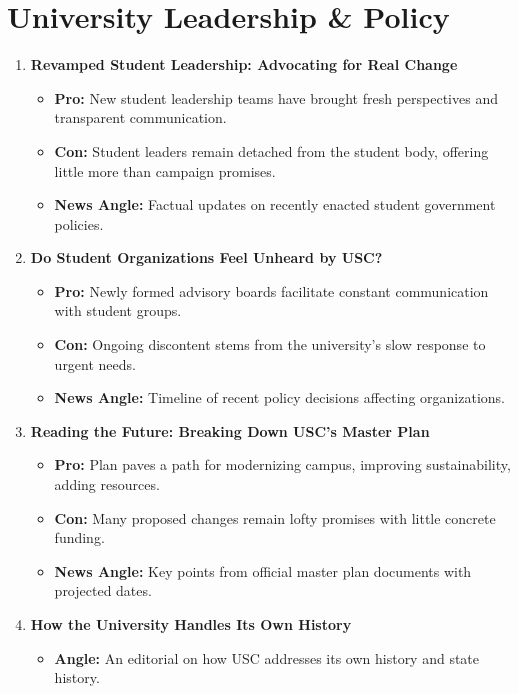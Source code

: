 \documentclass{article}
\begin{document}
\section*{University Leadership \& Policy}

\begin{enumerate}[leftmargin=*]
    \item \textbf{Revamped Student Leadership: Advocating for Real Change}
    \begin{itemize}
        \item \textbf{Pro:} New student leadership teams have brought fresh perspectives and transparent communication.
        \item \textbf{Con:} Student leaders remain detached from the student body, offering little more than campaign promises.
        \item \textbf{News Angle:} Factual updates on recently enacted student government policies.
    \end{itemize}

    \item \textbf{Do Student Organizations Feel Unheard by USC?}
    \begin{itemize}
        \item \textbf{Pro:} Newly formed advisory boards facilitate constant communication with student groups.
        \item \textbf{Con:} Ongoing discontent stems from the university's slow response to urgent needs.
        \item \textbf{News Angle:} Timeline of recent policy decisions affecting organizations.
    \end{itemize}

    \item \textbf{Reading the Future: Breaking Down USC's Master Plan}
    \begin{itemize}
        \item \textbf{Pro:} Plan paves a path for modernizing campus, improving sustainability, adding resources.
        \item \textbf{Con:} Many proposed changes remain lofty promises with little concrete funding.
        \item \textbf{News Angle:} Key points from official master plan documents with projected dates.
    \end{itemize}

    \item \textbf{How the University Handles Its Own History}
    \begin{itemize}
        \item \textbf{Angle:} An editorial on how USC addresses its own history and state history.
    \end{itemize}


\end{enumerate}
\end{document}
